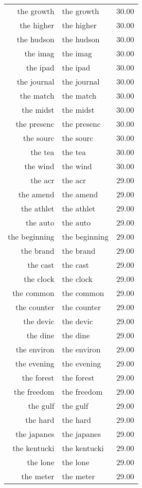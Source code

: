 \begin{table}[ht]
\begin{tabular}{rlr}
  the growth & the growth & 30.00 \\ 
  the higher & the higher & 30.00 \\ 
  the hudson & the hudson & 30.00 \\ 
  the imag & the imag & 30.00 \\ 
  the ipad & the ipad & 30.00 \\ 
  the journal & the journal & 30.00 \\ 
  the match & the match & 30.00 \\ 
  the midst & the midst & 30.00 \\ 
  the presenc & the presenc & 30.00 \\ 
  the sourc & the sourc & 30.00 \\ 
  the tea & the tea & 30.00 \\ 
  the wind & the wind & 30.00 \\ 
  the acr & the acr & 29.00 \\ 
  the amend & the amend & 29.00 \\ 
  the athlet & the athlet & 29.00 \\ 
  the auto & the auto & 29.00 \\ 
  the beginning & the beginning & 29.00 \\ 
  the brand & the brand & 29.00 \\ 
  the cast & the cast & 29.00 \\ 
  the clock & the clock & 29.00 \\ 
  the common & the common & 29.00 \\ 
  the counter & the counter & 29.00 \\ 
  the devic & the devic & 29.00 \\ 
  the dine & the dine & 29.00 \\ 
  the environ & the environ & 29.00 \\ 
  the evening & the evening & 29.00 \\ 
  the forest & the forest & 29.00 \\ 
  the freedom & the freedom & 29.00 \\ 
  the gulf & the gulf & 29.00 \\ 
  the hard & the hard & 29.00 \\ 
  the japanes & the japanes & 29.00 \\ 
  the kentucki & the kentucki & 29.00 \\ 
  the lone & the lone & 29.00 \\ 
  the meter & the meter & 29.00 \\ 

\end{tabular}
\end{table}
